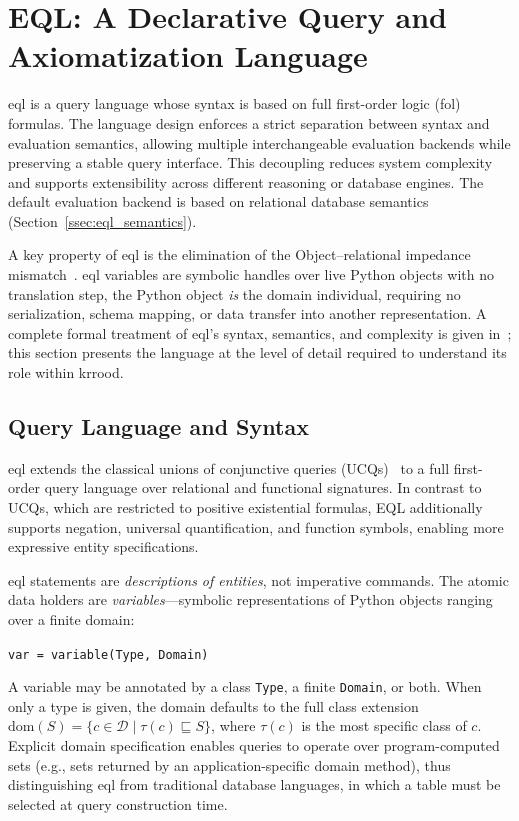 \documentclass[a4paper,fleqn]{cas-sc}
\begin{document}
\section{EQL: A Declarative Query and Axiomatization Language}
\label{sec:eql}

\ac{eql} is a query language whose syntax is based on full first-order logic (\ac{fol}) formulas. The language design enforces a strict separation between syntax and evaluation semantics, allowing multiple interchangeable evaluation backends while preserving a stable query interface. This decoupling reduces system complexity and supports extensibility across different reasoning or database engines. The default evaluation backend is based on relational database semantics (Section~\ref{ssec:eql_semantics}).

A key property of \ac{eql} is the elimination of the Object–relational impedance mismatch~\citep{neward2006vietnam,ireland2009classification}. \ac{eql} variables are symbolic handles over live Python objects
with no translation step, the Python object \emph{is} the domain individual, requiring no
serialization, schema mapping, or data transfer into another representation. A complete formal treatment of \ac{eql}'s syntax,
semantics, and complexity is given in~\citep{EQLFormalization2026}; this
section presents the language at the level of detail required to understand
its role within \ac{krrood}.


\subsection{Query Language and Syntax}
\label{ssec:eql_syntax}

\ac{eql} extends the classical unions of conjunctive queries (UCQs)~\cite{ChandraMerlin1977,ullman1988database,AbiteboulHullVianu1995} to a full first-order query language over relational and functional signatures. In contrast to UCQs, which are restricted to positive existential formulas, EQL additionally supports negation, universal quantification, and function symbols, enabling more expressive entity specifications.


\noindent
\ac{eql} statements are \emph{descriptions of entities}, not imperative
commands. The atomic data holders are \emph{variables}---symbolic
representations of Python objects ranging over a finite domain:
%
\begin{center}
  \texttt{var = variable(Type, Domain)}
\end{center}
%
A variable may be annotated by a class \texttt{Type}, a finite
\texttt{Domain}, or both. When only a type is given, the domain defaults to
the full class extension $\mathrm{dom}(S) = \{c \in \mathcal{D} \mid \tau(c)
\sqsubseteq S\}$, where $\tau(c)$ is the most specific class of $c$. Explicit
domain specification enables queries to operate over program-computed
sets (e.g., sets returned by an application-specific domain method), thus distinguishing
\ac{eql} from traditional database languages, in which a table must be
selected at query construction time.
\end{document}
